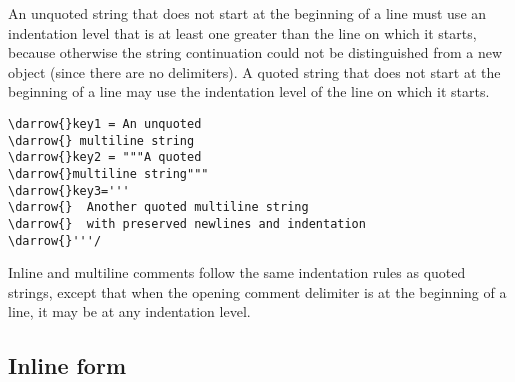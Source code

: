 \documentclass[11pt]{article}
\newcommand{\darrow}{\ensuremath{\textcolor{DarkGreen}{\downarrow}}}
\begin{document}
An unquoted string that does not start at the beginning of a line must use an indentation level that is at least one greater than the line on which it starts, because otherwise the string continuation could not be distinguished from a new object (since there are no delimiters).  A quoted string that does not start at the beginning of a line may use the indentation level of the line on which it starts.
\begin{Verbatim}[commandchars=\\\{\}]
\darrow{}key1 = An unquoted
\darrow{} multiline string
\darrow{}key2 = """A quoted
\darrow{}multiline string"""
\darrow{}key3='''
\darrow{}  Another quoted multiline string
\darrow{}  with preserved newlines and indentation
\darrow{}'''/
\end{Verbatim}

Inline and multiline comments follow the same indentation rules as quoted strings, except that when the opening comment delimiter is at the beginning of a line, it may be at any indentation level.

\subsection{Inline form}
\end{document}
